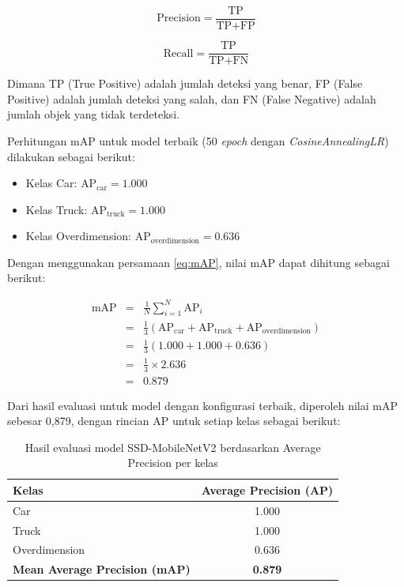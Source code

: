 \begin{equation}
\mbox{Precision} = \frac{\mbox{TP}}{\mbox{TP} + \mbox{FP}}
\label{eq:precision}
\end{equation}

\begin{equation}
\mbox{Recall} = \frac{\mbox{TP}}{\mbox{TP} + \mbox{FN}}
\label{eq:recall}
\end{equation}

Dimana TP (True Positive) adalah jumlah deteksi yang benar, FP (False Positive) adalah jumlah deteksi yang salah, dan FN (False Negative) adalah jumlah objek yang tidak terdeteksi.

Perhitungan mAP untuk model terbaik (50 \emph{epoch} dengan \emph{CosineAnnealingLR}) dilakukan sebagai berikut:

\begin{itemize}
  \item Kelas Car: $\mbox{AP}_{\mbox{car}} = 1.000$
  \item Kelas Truck: $\mbox{AP}_{\mbox{truck}} = 1.000$
  \item Kelas Overdimension: $\mbox{AP}_{\mbox{overdimension}} = 0.636$
\end{itemize}

Dengan menggunakan persamaan \ref{eq:mAP}, nilai mAP dapat dihitung sebagai berikut:

\begin{eqnarray}
\mbox{mAP} &=& \frac{1}{N} \sum_{i=1}^{N} \mbox{AP}_i \nonumber \\
&=& \frac{1}{3} (\mbox{AP}_{\mbox{car}} + \mbox{AP}_{\mbox{truck}} + \mbox{AP}_{\mbox{overdimension}}) \nonumber \\
&=& \frac{1}{3} (1.000 + 1.000 + 0.636) \nonumber \\
&=& \frac{1}{3} \times 2.636 \nonumber \\
&=& 0.879
\end{eqnarray}

Dari hasil evaluasi untuk model dengan konfigurasi terbaik, diperoleh nilai mAP sebesar 0,879, dengan rincian AP untuk setiap kelas sebagai berikut:

\begin{table}[htbp]
  \centering
  \begin{tabular}{|l|c|}
    \hline
    \rowcolor[HTML]{C0C0C0}
    \textbf{Kelas} & \textbf{Average Precision (AP)} \\
    \hline
    Car & 1.000 \\
    \hline
    Truck & 1.000 \\
    \hline
    Overdimension & 0.636 \\
    \hline
    \textbf{Mean Average Precision (mAP)} & \textbf{0.879} \\
    \hline
  \end{tabular}
  \caption{Hasil evaluasi model SSD-MobileNetV2 berdasarkan Average Precision per kelas}
  \label{tab:ap_results}
\end{table}

